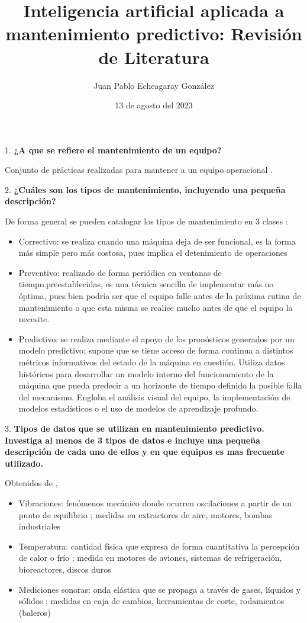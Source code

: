 \documentclass{article}
\title{\Large \bf Inteligencia artificial aplicada a mantenimiento predictivo: Revisión de Literatura}
\date{\normalsize 13 de agosto del 2023}
\author{\normalsize Juan Pablo Echeagaray González}
\affil{Ing. en Ciencias de Datos y Matemáticas, Tec de Monterrey}
\begin{document}
    \maketitle

    1. \textbf{¿A que se refiere el mantenimiento de un equipo?}

    Conjunto de prácticas realizadas para mantener a un equipo operacional \cite{wikipedia-contributors-2023-Maintenance}.

    2. \textbf{¿Cuáles son los tipos de mantenimiento, incluyendo una pequeña descripción?}

    De forma general se pueden catalogar los tipos de mantenimiento en 3 clases \cite{carvalho2019systematic}:
    \begin{itemize}
        \item Correctivo: se realiza cuando una máquina deja de ser funcional, es la forma más simple pero más costosa, pues implica el detenimiento de operaciones
        \item Preventivo: realizado de forma periódica en ventanas de tiempo.preestablecidas, es una técnica sencilla de implementar más no óptima, pues bien podría ser que el equipo falle antes de la próxima rutina de mantenimiento o que esta misma se realice mucho antes de que el equipo la necesite.
        \item Predictivo: se realiza mediante el apoyo de los pronósticos generados por un modelo predictivo; supone que se tiene acceso de forma continua a distintos métricos informativos del estado de la máquina en cuestión. Utiliza datos históricos para desarrollar un modelo interno del funcionamiento de la máquina que pueda predecir a un horizonte de tiempo definido la posible falla del mecanismo. Engloba el análisis visual del equipo, la implementación de modelos estadísticos o el uso de modelos de aprendizaje profundo.
    \end{itemize}

    3. \textbf{Tipos de datos que se utilizan en mantenimiento predictivo. Investiga al menos de 3 tipos de datos e incluye una pequeña descripción de cada uno de ellos y en que equipos es mas frecuente utilizado.}

    Obtenidos de \cite{carvalho2019systematic}, \cite{zhang2019data}
    \begin{itemize}
        \item Vibraciones: fenómenos mecánico donde ocurren oscilaciones a partir de un punto de equilibrio \cite{wikipedia-contributors-2023-Vibration}; medidas en extractores de aire, motores, bombas industriales
        \item Temperatura: cantidad física que expresa de forma cuantitativa la percepción de calor o frío \cite{wikipedia-contributors-2023-Temperature}; medida en motores de aviones, sistemas de refrigeración, bioreactores, discos duros
        \item Mediciones sonoras: onda elástica que se propaga a través de gases, líquidos y sólidos \cite{BELCHAMBER2005324}; medidas en caja de cambios, herramientas de corte, rodamientos (baleros)
    \end{itemize}
\end{document}
